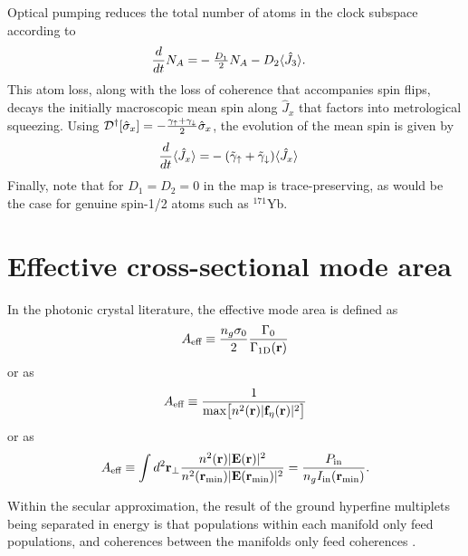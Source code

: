 \documentclass[preprint,aps,pra,onecolumn]{revtex4-1} %
\newcommand{\oneD}{{\rm 1D}}
\newcommand{\inp}{{\rm in}}
\newcommand{\gammau}{\gamma_{\uparrow}}
\newcommand{\gammad}{\gamma_{\downarrow}}
\newcommand{\gammap}{\tilde{\gamma}_\uparrow + \tilde{\gamma}_\downarrow}
\newcommand{\change}[1]{{\color{RoyalBlue} #1}}
\begin{document}
\begin{appendix}
Optical pumping reduces the total number of atoms in the clock subspace according to
	\begin{align}
		\frac{d}{dt} N_A =&  - \mbox{$\frac{D_1}{2}$} N_A - D_2 \langle{ \hat{J}_3 }\rangle.
	\end{align}
This atom loss, along with the loss of coherence that accompanies spin flips, decays the initially macroscopic mean spin along $\hat{J}_x$ that factors into metrological squeezing. Using $\mathcal{D}\dg[\hat{\sigma}_x] = - \frac{ \gammau  + \gammad}{2} \hat{\sigma}_x $, the evolution of the mean spin is given by
 	\begin{align}
		\frac{d}{dt} \expt{\hat{J}_x} =& - (\gammap) \expt{\hat{J}_x}
	\end{align}
Finally, note that for $D_1 = D_2 = 0$ in  the map is trace-preserving, as would be the case for genuine spin-1/2 atoms such as $^{171}$Yb. 


\change{
\section{Effective cross-sectional mode area} \label{Appendix::ModeArea}
In the photonic crystal literature, the effective mode area is defined as \cite{goban_atomlight_2014}
	\begin{align}
		A_\eff \equiv \frac{n_g \sigma_0}{2} \frac{\Gamma_0}{\Gamma_\oneD(\mathbf{r})}
	\end{align}
or as \cite{manga_rao_single_2007}
	\begin{align}
		A_{\text{eff}} \equiv \frac{1}{ \mbox{max} \big[ n^2(\mathbf{r}) |\mathbf{f}_\eta(\mathbf{r})|^2 \big]}
	\end{align}
or as \cite{hung_trapped_2013}
	\begin{align}
		A_\eff \equiv \int d^2 \mathbf{r}_\perp \frac{n^2(\mathbf{r}) |\mathbf{E}(\mathbf{r})|^2 }{n^2(\mathbf{r}_{\rm min}) |\mathbf{E}(\mathbf{r}_{\rm min})|^2 } =  \frac{P_\inp}{ n_g  I_\inp(\mathbf{r}_{\rm min}) }.
	\end{align}
	
Within the secular approximation, the result of the ground hyperfine multiplets being separated in energy is that populations within each manifold only feed populations, and coherences between the manifolds only feed coherences \cite{deutsch_quantum_2010}.  
}

\end{appendix}
\end{document}
